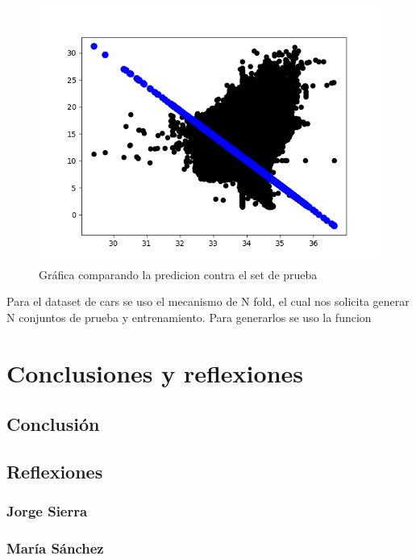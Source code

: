 \documentclass[sigconf]{acmart}
\begin{document}
	\begin{figure}
		\centering
		\includegraphics[width=0.7\linewidth]{img/validacionSimpleWater.png}
		\caption{Gráfica comparando la predicion contra el set de prueba}
		\label{fig:waterSimpleVal}
	\end{figure}
	
	Para el dataset de cars se uso el mecanismo de N fold, el cual nos solicita generar N conjuntos de prueba y entrenamiento. Para generarlos se uso la funcion
	
	
	\section{Conclusiones y reflexiones}
	
	\subsection{Conclusión}
	\subsection{Reflexiones}
	\subsubsection{Jorge Sierra}
	\subsubsection{María Sánchez}
	
	
	
	
\end{document}
